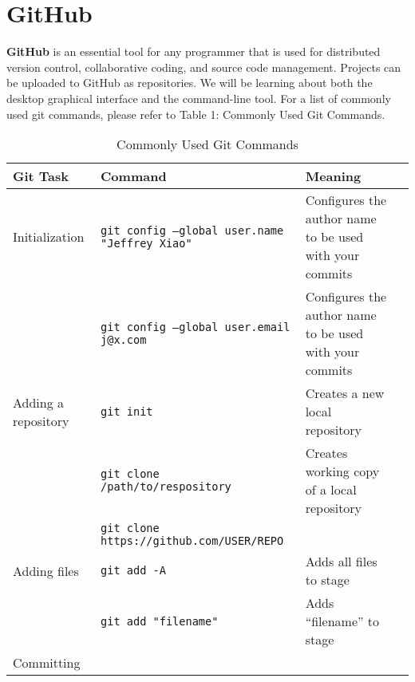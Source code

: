 \documentclass[11pt, letterpaper]{article}
\begin{document}
	\section{GitHub}
		\textbf{GitHub} is an essential tool for any programmer that is used for distributed version control, collaborative coding, and source code management. Projects can be uploaded to GitHub as repositories. We will be learning about both the desktop graphical interface and the command-line tool. For a list of commonly used git commands, please refer to Table 1: Commonly Used Git Commands.

		\begin{table}[!htb]
			\vspace*{-4cm}
			\begin{center}
				\caption{Commonly Used Git Commands}
				\hspace*{-2.5cm}
				\vspace*{-5cm}
				\begin{tabular}{p{2cm} l p{4cm} l}
					\toprule
					Git Task & Command & Meaning \\
					\midrule
					Initialization 
					
					& \texttt{git config --global user.name "Jeffrey Xiao"} & Configures the author name to be used with your commits \\\cmidrule{2-3}
									
					& \texttt{git config --global user.email j@x.com} & Configures the author name to be used with your commits \\
					
					\midrule
					Adding a repository
					
					& \texttt{git init} & Creates a new local repository \\\cmidrule{2-3}

					& \texttt{git clone /path/to/respository} & Creates working copy of a local repository \\\cmidrule{2-3}
										
					& \texttt{git clone https://github.com/USER/REPO} \\

					\midrule
					Adding files

					& \texttt{git add -A} & Adds all files to stage \\\cmidrule{2-3}
					
					& \texttt{git add "filename"} & Adds ``filename'' to stage \\

					\midrule
					Committing


\end{tabular}
\end{center}
\end{table}
\end{document}
